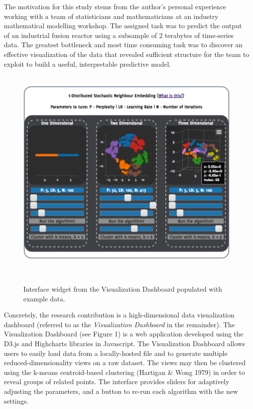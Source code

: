 \documentclass{sigchi}
\begin{document}
%
The motivation for this study stems from the author's personal experience working with a team of statisticians and mathematicians at an industry mathematical modelling workshop. %
%
The assigned task was to predict the output of an industrial fusion reactor using a subsample of 2 terabytes of time-series data. %
%
The greatest bottleneck and most time consuming task was to discover an effective visualization of the data that revealed sufficient structure for the team to exploit to build a useful, interpretable predictive model.%
%
\\\\%
%
\begin{figure}
  \centering
  \includegraphics[width=.99\columnwidth]{figures/main_populated}
  \caption{Interface widget from the Visualization Dashboard populated with example data.}~\label{fig:figure1}
\end{figure}
%
Concretely, the research contribution is a high-dimensional data visualization dashboard (referred to as the \textit{Visualization Dashboard} in the remainder). %
%
The Visualization Dashboard (see Figure 1) is a web application developed using the D3.js \cite{d3js} and Highcharts libraries in Javascript. %
%
The Visualization Dashboard allows users to easily load data from a locally-hosted file and to generate multiple reduced-dimensionality views on a raw dataset. %
%
The views may then be clustered using the k-means centroid-based clustering (Hartigan \& Wong 1979) in order to reveal groups of related points. %
%
The interface provides sliders for adaptively adjusting the parameters, and a button to re-run each algorithm with the new settings. %
\end{document}
